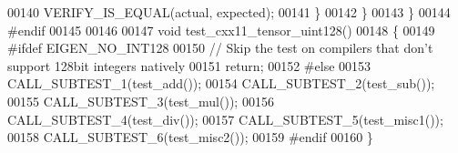 \begin{DoxyCode}
00140       VERIFY\_IS\_EQUAL(actual, expected);
00141     \}
00142   \}
00143 \}
00144 \textcolor{preprocessor}{#endif}
00145 
00146 
00147 \textcolor{keywordtype}{void} test\_cxx11\_tensor\_uint128()
00148 \{
00149 \textcolor{preprocessor}{#ifdef EIGEN\_NO\_INT128}
00150   \textcolor{comment}{// Skip the test on compilers that don't support 128bit integers natively}
00151   \textcolor{keywordflow}{return};
00152 \textcolor{preprocessor}{#else}
00153   CALL\_SUBTEST\_1(test\_add());
00154   CALL\_SUBTEST\_2(test\_sub());
00155   CALL\_SUBTEST\_3(test\_mul());
00156   CALL\_SUBTEST\_4(test\_div());
00157   CALL\_SUBTEST\_5(test\_misc1());
00158   CALL\_SUBTEST\_6(test\_misc2());
00159 \textcolor{preprocessor}{#endif}
00160 \}
\end{DoxyCode}
